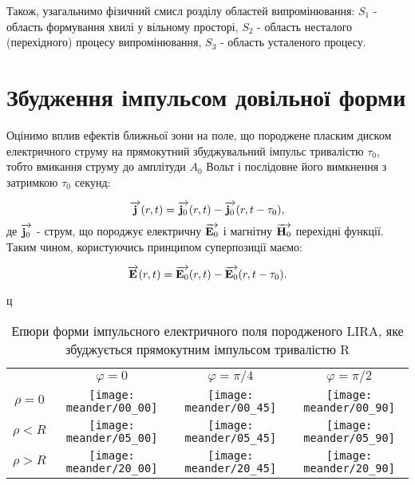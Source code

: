 Також, узагальнимо фізичний смисл розділу областей випромінювання: 
$ S_1 $ - область формування хвилі у вільному просторі, $ S_2 $ - область 
несталого (перехідного) процесу випромінювання, $ S_3 $ - область
усталеного процесу.

\section{Збудження імпульсом довільної форми}

Оцінимо вплив ефектів ближньої зони на поле, що породжене пласким диском 
електричного струму на прямокутний збуджувальний імпульс тривалістю 
$ \tau_0 $, тобто вмикання струму до амплітуди $ A_0 $ Вольт і послідовне 
його вимкнення з затримкою $ \tau_0 $ секунд:

\begin{equation}
\overrightarrow{\mathbf j} (r,t) = \overrightarrow{\mathbf j_0} (r,t) - \overrightarrow{\mathbf j_0} (r,t-\tau_0),
\end{equation}
%
де $ \overrightarrow{\mathbf j_0} $ - струм, що породжує електричну $ \overrightarrow{\mathbf E_0} $ і магнітну 
$ \overrightarrow{\mathbf H_0} $ перехідні функції. Таким чином, користуючись принципом 
суперпозиції маємо:

\begin{equation}
\overrightarrow{\mathbf E} (r,t) = \overrightarrow{\mathbf E_0} (r,t) - \overrightarrow{\mathbf E_0} (r,t-\tau_0).
\end{equation}

\begin{table}[ht]
\caption{Епюри форми імпульсного електричного поля породженого LIRA, 
яке збуджується прямокутним імпульсом тривалістю R}
\label{tab:meander_shape}ц
\centering
\begin{tabular}{cccc}

& $ \varphi = 0 $ & $ \varphi = \pi/4 $ & $ \varphi = \pi/2 $ \\

$ \rho = 0 $ &
\texttt{[image: meander/00\_00]} & 
\texttt{[image: meander/00\_45]} & 
\texttt{[image: meander/00\_90]} \\

$ \rho < R $ &
\texttt{[image: meander/05\_00]} & 
\texttt{[image: meander/05\_45]} & 
\texttt{[image: meander/05\_90]} \\

$ \rho > R $ &
\texttt{[image: meander/20\_00]} & 
\texttt{[image: meander/20\_45]} & 
\texttt{[image: meander/20\_90]} \\

\end{tabular}
\end{table}

